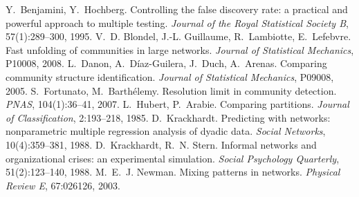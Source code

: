  Y.~Benjamini, Y.~Hochberg. Controlling the false
  discovery rate: a practical and powerful approach to multiple testing.
  \emph{Journal of the Royal Statistical Society B}, 57(1):289--300, 1995.
 V.~D. Blondel, J.-L. Guillaume, R.~Lambiotte,
  E.~Lefebvre. Fast unfolding of communities in large networks. \emph{Journal
  of Statistical Mechanics}, P10008, 2008.
 L.~Danon, A.~D\'iaz-Guilera, J.~Duch, A.~Arenas. Comparing
  community structure identification. \emph{Journal of Statistical Mechanics},
  P09008, 2005.
 S.~Fortunato, M.~Barth\'elemy. Resolution limit in
  community detection. \emph{PNAS}, 104(1):36--41, 2007.
 L.~Hubert, P.~Arabie. Comparing partitions. \emph{Journal
  of Classification}, 2:193--218, 1985.
 D.~Krackhardt. Predicting with networks:
  nonparametric multiple regression analysis of dyadic data. \emph{Social
  Networks}, 10(4):359--381, 1988.
 D.~Krackhardt, R.~N. Stern. Informal networks and
  organizational crises: an experimental simulation. \emph{Social Psychology
  Quarterly}, 51(2):123--140, 1988.
 M.~E.~J. Newman. Mixing patterns in networks.
  \emph{Physical Review E}, 67:026126, 2003.
